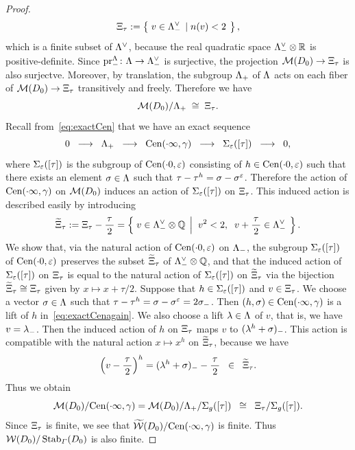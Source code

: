 \documentclass{amsart} %
\begin{document}
\begin{proof}
\begin{equation}
\Xi_{\tau}:=\left\{\; {v\in \Lambda_{-}^{\vee} } \; \left\vert \; {n(v)<2} \; \right.\right \},
\end{equation}
%
which is a finite subset of $\Lambda^{\vee}$, because 
the real quadratic space 
$ \Lambda_{-}^{\vee}\otimes \mathord{\mathbb{R}}$ is positive-definite.
Since $\operatorname{pr}^{\Lambda}_{-}\colon \Lambda \to \Lambda_{-}^{\vee}$ is surjective,
the projection $\mathord{\mathcal{M}}(D_0) \to \Xi_{\tau}$ is also surjectve.
Moreover, by translation,
the subgroup $\Lambda_{+}$ of $\Lambda$ acts on each fiber of $\mathord{\mathcal{M}}(D_0) \to \Xi_{\tau}$ 
transitively and freely.
Therefore we have 
\[
\mathord{\mathcal{M}}(D_0)/\Lambda_{+} \;\cong \; \Xi_{\tau}. 
\]
Recall from~\eqref{eq:exactCen} that
we have an exact sequence
%
\begin{equation}\label{eq:exactCenagain}
0\;\;\longrightarrow\;\;\Lambda_{+}\;\; \longrightarrow \;\; 
\mathrm{Cen}(\cdot \infty, \gamma)
\;\; \longrightarrow \;\; 
\Sigma_{\varepsilon}([\tau])
\;\; \longrightarrow \;\; 0,
\end{equation}
%
where $\Sigma_{\varepsilon}([\tau])$ is the subgroup of $\mathrm{Cen}(\cdot 0, \varepsilon)$
consisting of $h\in \mathrm{Cen}(\cdot 0, \varepsilon)$ such that 
there exists an element $\sigma\in \Lambda$ such that $\tau-\tau^h=\sigma-\sigma^{\varepsilon}$.
Therefore the action 
of $\mathrm{Cen}(\cdot \infty, \gamma)$ on $\mathord{\mathcal{M}}(D_0)$ induces an action of 
$\Sigma_{\varepsilon}([\tau])$ on $\Xi_{\tau}$. 
This induced action is described easily by introducing 
%
\begin{equation}\label{eq:tilXi}
\widetilde{\Xi}_{\tau}:=\Xi_{\tau} -\dfrac{\tau}{\,2\,}
=\left\{\; {v\in \Lambda_{-}^{\vee}\otimes\mathord{\mathbb{Q}}} \; \left\vert \; {\;v^2<2, \;\; v+\dfrac{\tau}{\,2\,}\in \Lambda_{-}^{\vee}} \; \right.\right \}.
\end{equation}
%
We show that, via the natural action of $\mathrm{Cen}(\cdot 0, \varepsilon)$ on $\Lambda_{-}$,
the subgroup 
$\Sigma_{\varepsilon}([\tau])$ of $\mathrm{Cen}(\cdot 0, \varepsilon)$
preserves the subset $\widetilde{\Xi}_{\tau}$ of $\Lambda_{-}^{\vee}\otimes\mathord{\mathbb{Q}}$,
and that 
the induced action of 
$\Sigma_{\varepsilon}([\tau])$ on $\Xi_{\tau}$
is equal to the natural action of $\Sigma_{\varepsilon}([\tau])$ on $\widetilde{\Xi}_{\tau}$
via the 
bijection $\widetilde{\Xi}_{\tau}\cong \Xi_{\tau}$ given by 
$x\mapsto x+\tau/2$.
Suppose that $h\in \Sigma_{\varepsilon}([\tau])$ and $v\in \Xi_{\tau}$.
We choose a vector $\sigma\in \Lambda$ such that $\tau-\tau^h=\sigma-\sigma^\varepsilon=2\sigma_{-}$.
Then $(h, \sigma)\in \mathrm{Cen}(\cdot \infty, \gamma)$ is a lift of $h$ in~\eqref{eq:exactCenagain}.
We also choose a lift $\lambda\in \Lambda$ of $v$,
that is, we have $v=\lambda\sb{-}$.
Then the induced action of $h$ on $\Xi_{\tau}$ maps $v$ to $(\lambda^h+\sigma)\sb{-}$.
This action is compatible with the natural action $x\mapsto x^h$ on $\widetilde{\Xi}_{\tau}$,  because we have 
\[
\left(v-\dfrac{\tau}{\,2\,}\right)^h=(\lambda^h+\sigma)_{-}-\dfrac{\tau}{\,2\,}\;\;\in\;\;\widetilde{\Xi}_{\tau}.
\]
 Thus we obtain 
%
\begin{equation}\label{eq:orbitss}
 \MMM(D_0)/\Cen(\dotinf, \gamma)= \MMM(D_0)/\Leechplus/\Sigma_{g}([\tau])\;\;\cong\;\; \Xitau/\Sigma_{g}([\tau]). %
\end{equation}
%
Since $\Xi_{\tau}$ is finite, 
we see that 
$\widetilde{\mathord{\mathcal{W}}}(D_0)/\mathrm{Cen}(\cdot \infty, \gamma)$ is finite. 
Thus $\mathord{\mathcal{W}}(D_0)/\operatorname{Stab}_{\varGamma}(D_0)$ is also finite. 
%
\end{proof}
\end{document}
